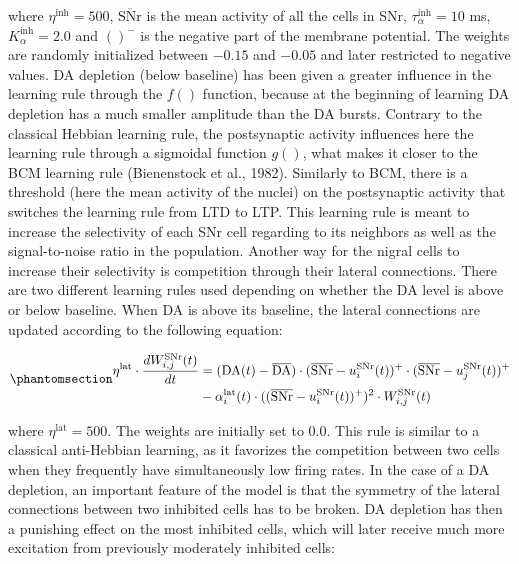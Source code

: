 \documentclass[
  11pt,
  a4paper,
]{scrbook}
\begin{document}
where \(\eta^{\text{inh}} = 500\), \(\overline{\text{SNr}}\) is the mean
activity of all the cells in SNr, \(\tau^{\text{inh}}_{\alpha} = 10\)
ms, \(K^{\text{inh}}_{\alpha} = 2.0\) and \(()^-\) is the negative part
of the membrane potential. The weights are randomly initialized between
\(-0.15\) and \(-0.05\) and later restricted to negative values. DA
depletion (below baseline) has been given a greater influence in the
learning rule through the \(f()\) function, because at the beginning of
learning DA depletion has a much smaller amplitude than the DA bursts.
Contrary to the classical Hebbian learning rule, the postsynaptic
activity influences here the learning rule through a sigmoidal function
\(g()\), what makes it closer to the BCM learning rule (Bienenstock et
al., 1982). Similarly to BCM, there is a threshold (here the mean
activity of the nuclei) on the postsynaptic activity that switches the
learning rule from LTD to LTP. This learning rule is meant to increase
the selectivity of each SNr cell regarding to its neighbors as well as
the signal-to-noise ratio in the population. Another way for the nigral
cells to increase their selectivity is competition through their lateral
connections. There are two different learning rules used depending on
whether the DA level is above or below baseline. When DA is above its
baseline, the lateral connections are updated according to the following
equation:

\begin{equation}\phantomsection\label{eq-ficn:latgpipos}{
\begin{aligned}
    \eta^{\text{lat}} \cdot \frac{d W^{\text{SNr}}_{i,j}(t)}{d t}  & = (\text{DA}(t) - \overline{\text{DA}}) \cdot ( \overline{\text{SNr}} - u^{\text{SNr}}_i(t))^+  \cdot ( \overline{\text{SNr}} - u^{\text{SNr}}_j(t))^+ \\
    &  - \alpha^{\text{lat}}_i(t) \cdot ( (\overline{\text{SNr}} -u^{\text{SNr}}_i(t) )^+ )^2 \cdot W^{\text{SNr}}_{i, j}(t)
\end{aligned}
}\end{equation}

where \(\eta^{\text{lat}}= 500\). The weights are initially set to
\(0.0\). This rule is similar to a classical anti-Hebbian learning, as
it favorizes the competition between two cells when they frequently have
simultaneously low firing rates. In the case of a DA depletion, an
important feature of the model is that the symmetry of the lateral
connections between two inhibited cells has to be broken. DA depletion
has then a punishing effect on the most inhibited cells, which will
later receive much more excitation from previously moderately inhibited
cells:
\end{document}
